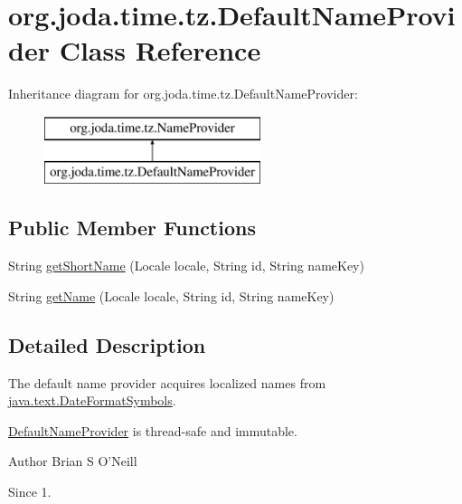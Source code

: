 \hypertarget{classorg_1_1joda_1_1time_1_1tz_1_1_default_name_provider}{\section{org.\-joda.\-time.\-tz.\-Default\-Name\-Provider Class Reference}
\label{classorg_1_1joda_1_1time_1_1tz_1_1_default_name_provider}
}
Inheritance diagram for org.\-joda.\-time.\-tz.\-Default\-Name\-Provider\-:\begin{figure}[H]
\begin{center}
\leavevmode
\includegraphics[height=2.000000cm]{classorg_1_1joda_1_1time_1_1tz_1_1_default_name_provider}
\end{center}
\end{figure}
\subsection*{Public Member Functions}
\begin{DoxyCompactItemize}
\item 
String \hyperlink{classorg_1_1joda_1_1time_1_1tz_1_1_default_name_provider_a81ca68774fac0760c7acd33e4ac19f8e}{get\-Short\-Name} (Locale locale, String id, String name\-Key)
\item 
String \hyperlink{classorg_1_1joda_1_1time_1_1tz_1_1_default_name_provider_ad6bf820422b6069565e4f5a762b391e2}{get\-Name} (Locale locale, String id, String name\-Key)
\end{DoxyCompactItemize}


\subsection{Detailed Description}
The default name provider acquires localized names from \hyperlink{}{java.\-text.\-Date\-Format\-Symbols}. 

\hyperlink{classorg_1_1joda_1_1time_1_1tz_1_1_default_name_provider}{Default\-Name\-Provider} is thread-\/safe and immutable.

\begin{DoxyAuthor}{Author}
Brian S O'Neill 
\end{DoxyAuthor}
\begin{DoxySince}{Since}
1. 
\end{DoxySince}


